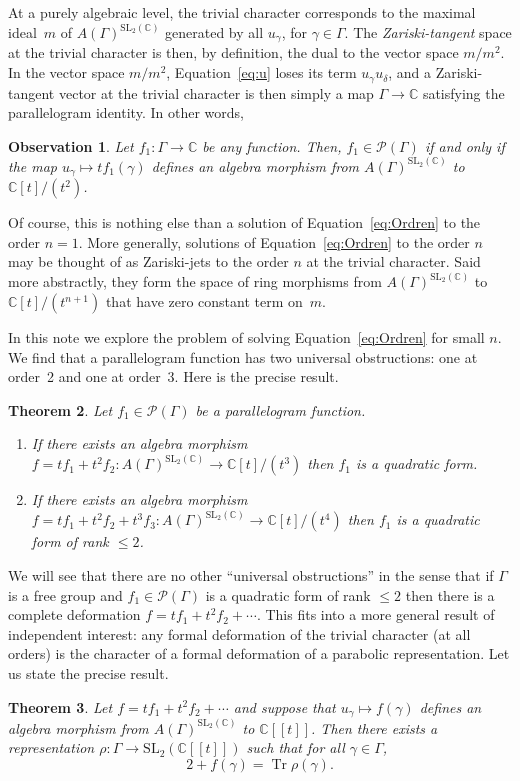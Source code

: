 \documentclass[JEP,XML,SOM,Unicode,NoEqCountersInSection]{cedram}
\let\mathcal\mathscr
\newcommand{\lbr}{[\![}
\newcommand{\rbr}{]\!]}
\newtheorem{theorem}{Theorem}[section]
\newtheorem{observation}[theorem]{Observation}
\theoremstyle{definition}
\newcommand{\CC}{\mathbb{C}}
\newcommand{\tr}{\operatorname{Tr}}
\newcommand{\SL}{\mathrm{SL}}
\begin{document}
At a purely algebraic level, the trivial character corresponds to the
maximal ideal~$m$ of $A(\Gamma)^{\SL_2(\CC)}$ generated by all
$u_\gamma$, for $\gamma\in\Gamma$.
The {\em Zariski-tangent} space at the trivial character is then, by
definition, the dual to the vector space $m/m^2$.
In the vector space $m/m^2$, Equation~\eqref{eq:u} loses its term
$u_\gamma u_\delta$, and a Zariski-tangent vector at the trivial
character is then simply a map $\Gamma\to\CC$ satisfying the parallelogram
identity.
In other words,
\begin{observation}
Let $f_1\colon\Gamma\to\CC$ be any function.
Then, $f_1\in\mathcal{P}(\Gamma)$ if and only if the map
$u_\gamma\mapsto tf_1(\gamma)$ defines an algebra morphism from
$A(\Gamma)^{\SL_2(\CC)}$ to $\CC[t]/(t^2)$.
\end{observation}
Of course, this is nothing else than a solution of
Equation~\eqref{eq:Ordren} to the order $n=1$.
More generally, solutions of Equation~\eqref{eq:Ordren} to the order $n$
may be thought of as Zariski-jets
to the order $n$
at the trivial character.
Said more abstractly, they form the space of ring morphisms from
$A(\Gamma)^{\SL_2(\CC)}$ to $\CC[t]/(t^{n+1})$ that have zero constant term
on~$m$.

In this note we explore the problem of solving Equation~\eqref{eq:Ordren}
for small $n$. We find that a parallelogram function has two universal
obstructions: one at order~2 and one at order~3. Here is the precise result.
\begin{theorem}\label{theo:obstruction}
Let $f_1\in \mathcal{P}(\Gamma)$ be a parallelogram function.
\begin{enumerate}
\item If there exists an algebra morphism
$f=tf_1+t^2f_2:A(\Gamma)^{\SL_2(\CC)}\to \CC[t]/(t^3)$
then $f_1$ is a quadratic form.
\item If there exists an algebra morphism
$f=tf_1+t^2f_2+t^3f_3:A(\Gamma)^{\SL_2(\CC)}\to \CC[t]/(t^4)$
then $f_1$ is a quadratic form of rank $\leq 2$.
\end{enumerate}
\end{theorem}

We will see that there are no other ``universal obstructions'' in the sense
that if $\Gamma$ is a free group and $f_1\in \mathcal{P}(\Gamma)$ is a
quadratic form of rank $\leq 2$ then there is a complete deformation
$f=tf_1+t^2f_2+\cdots$. This fits into a more general result of independent
interest: any formal deformation of the trivial character (at all orders)
is the character of a formal deformation of a parabolic representation.
Let us state the precise result.
\begin{theorem}\label{theo:lifting}
Let $f=tf_1+t^2 f_2+\cdots$
and suppose that $u_\gamma\mapsto f(\gamma)$ defines an algebra morphism
from $A(\Gamma)^{\SL_2(\CC)}$ to $\CC\lbr t\rbr$. Then there
exists a representation $\rho\colon\Gamma\to \SL_2(\CC\lbr t\rbr)$ such that
for all $\gamma\in \Gamma$,
\[
2+f(\gamma)=\tr \rho(\gamma).
\]
\end{theorem}
\end{document}
